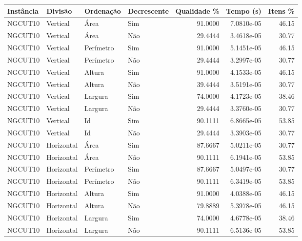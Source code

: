\begin{tabular}{llllrrr}
    \hline
    Instância & Divisão     & Ordenação & Decrescente & Qualidade \% & Tempo (s)  & Itens \% \\
    \hline
    NGCUT10   & Vertical    & Área      & Sim         & 91.0000      & 7.0810e-05 & 46.15    \\
    NGCUT10   & Vertical    & Área      & Não         & 29.4444      & 3.4618e-05 & 30.77    \\
    NGCUT10   & Vertical    & Perímetro & Sim         & 91.0000      & 5.1451e-05 & 46.15    \\
    NGCUT10   & Vertical    & Perímetro & Não         & 29.4444      & 3.2997e-05 & 30.77    \\
    NGCUT10   & Vertical    & Altura    & Sim         & 91.0000      & 4.1533e-05 & 46.15    \\
    NGCUT10   & Vertical    & Altura    & Não         & 39.4444      & 3.5191e-05 & 30.77    \\
    NGCUT10   & Vertical    & Largura   & Sim         & 74.0000      & 4.1723e-05 & 38.46    \\
    NGCUT10   & Vertical    & Largura   & Não         & 29.4444      & 3.3760e-05 & 30.77    \\
    NGCUT10   & Vertical    & Id        & Sim         & 90.1111      & 6.8665e-05 & 53.85    \\
    NGCUT10   & Vertical    & Id        & Não         & 29.4444      & 3.3903e-05 & 30.77    \\
    NGCUT10   & Horizontal  & Área      & Sim         & 87.6667      & 5.0211e-05 & 30.77    \\
    NGCUT10   & Horizontal  & Área      & Não         & 90.1111      & 6.1941e-05 & 53.85    \\
    NGCUT10   & Horizontal  & Perímetro & Sim         & 87.6667      & 5.0497e-05 & 30.77    \\
    NGCUT10   & Horizontal  & Perímetro & Não         & 90.1111      & 6.3419e-05 & 53.85    \\
    NGCUT10   & Horizontal  & Altura    & Sim         & 91.0000      & 4.0388e-05 & 46.15    \\
    NGCUT10   & Horizontal  & Altura    & Não         & 79.8889      & 5.3978e-05 & 46.15    \\
    NGCUT10   & Horizontal  & Largura   & Sim         & 74.0000      & 4.6778e-05 & 38.46    \\
    NGCUT10   & Horizontal  & Largura   & Não         & 90.1111      & 6.5136e-05 & 53.85    \\

\end{tabular}
